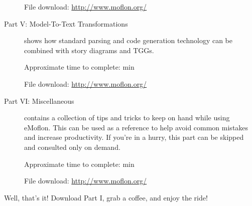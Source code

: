 \begin{description}
{File download: \href{http://www.moflon.org/ }{http://www.moflon.org/}}

\item[Part V: Model-To-Text Transformations] shows how standard parsing and code generation technology can be combined with story diagrams and TGGs.

{\small Approximate time to complete: min 

File download: \href{http://www.moflon.org/ }{http://www.moflon.org/}}

\item[Part VI: Miscellaneous] contains a collection of tips and tricks to keep on hand while using eMoflon. This can be used as a reference to help avoid common
mistakes and increase productivity. If you're in a hurry, this part can be skipped and consulted only on demand.

{\small Approximate time to complete: min 

File download: \href{http://www.moflon.org/ }{http://www.moflon.org/}}

\end{description}

Well, that's it! Download Part I, grab a coffee, and enjoy the ride!
